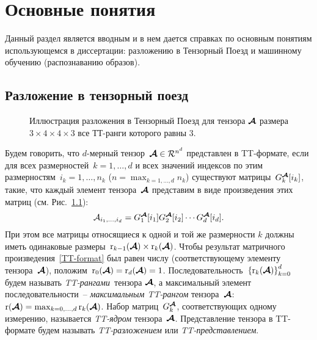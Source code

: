 \chapter{Основные понятия} \label{chap:definitions}
Данный раздел является вводным и в нем дается справках по основным понятиям использующемся в диссертации: разложению в Тензорный Поезд и машинному обучению (распознаванию образов).
\section{Разложение в тензорный поезд} \label{sec:tt-decomposition}

\begin{figure}[ht]
  \begin{center}
    \def\svgwidth{14cm}
    \normalsize
    
    \caption{Иллюстрация разложения в Тензорный Поезд для тензора $\boldsymbol{\mathcal{A}}$ размера $3 \times 4 \times 4 \times 3$ все ТТ-ранги которого равны $3$. \label{fig:TT}}
    \end{center}
\end{figure}

Будем говорить, что $d$-мерный тензор~$\boldsymbol{\mathcal{A}} \in \mathcal{R}^{n^d}$ представлен в TT\hyp{}формате, если для всех размерностей~$k=1,\ldots,d$ и всех значений индексов по этим размерностям~$i_k = 1, \ldots, n_k$ ($n = \max_{k=1,\ldots,d} n_k$) существуют матрицы~$G_k^{\boldsymbol{\mathcal{A}}}[i_k]$, такие, что каждый элемент тензора~$\boldsymbol{\mathcal{A}}$ представим в виде произведения этих матриц (см. Рис.~\ref{fig:TT}):
\begin{equation}
\label{TT-format}
\mathcal{A}_{i_1, \ldots, i_d} = G_1^{\boldsymbol{\mathcal{A}}}[i_1] G^{\boldsymbol{\mathcal{A}}}_2[i_2] \dotsm G^{\boldsymbol{\mathcal{A}}}_d[i_d].
\end{equation}
При этом все матрицы относящиеся к одной и той же размерности $k$ должны иметь одинаковые размеры~$\operatorname{r}_{k-1}(\boldsymbol{\mathcal{A}}) \times \operatorname{r}_k(\boldsymbol{\mathcal{A}})$. Чтобы результат матричного произведения~\eqref{TT-format} был равен числу (соответствующему элементу тензора~$\boldsymbol{\mathcal{A}}$), положим~$\operatorname{r}_{0}(\boldsymbol{\mathcal{A}}) = \operatorname{r}_{d}(\boldsymbol{\mathcal{A}}) = 1$. Последовательность~$\left\{\operatorname{r}_k(\boldsymbol{\mathcal{A}})\right\}_{k=0}^d$ будем называть \emph{TT\hyp{}рангами}~тензора $\boldsymbol{\mathcal{A}}$, а максимальный элемент последовательности~-- \emph{максимальным TT\hyp{}рангом} тензора~$\boldsymbol{\mathcal{A}}$:~$\operatorname{r}(\boldsymbol{\mathcal{A}}) = \max_{k = 0, \dots, d} \operatorname{r}_k(\boldsymbol{\mathcal{A}})$.
Набор матриц~$G^{\boldsymbol{\mathcal{A}}}_k$, соответствующих одному измерению, называется \emph{TT\hyp{}ядром} тензора~$\boldsymbol{\mathcal{A}}$.
Представление тензора в TT\hyp{}формате будем называть \emph{TT\hyp{}разложением} или \emph{TT\hyp{}представлением}.

